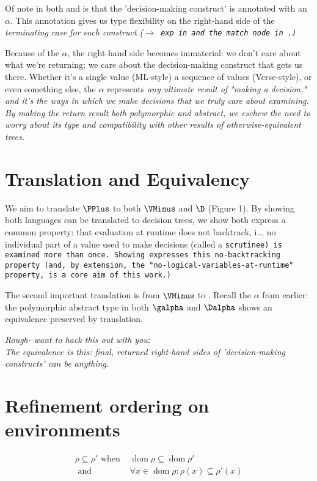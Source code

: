 \documentclass[]{article}
\DeclareMathOperator{\dom}{dom}
\begin{document}
Of note in both {\VMinus} and {\D} is that the 'decision-making construct' is 
annotated with an $\alpha$. This annotation gives us type flexibility on the 
right-hand side of the \it{terminating} case for each construct 
(\tt{$\rightarrow$ exp} in {\VMinus} and the match node in {\D}.) 

Because of the $\alpha$, the right-hand side becomes immaterial: we don't care
about what we're returning; we care about the decision-making construct that
gets us there. Whether it's a single value (ML-style) a sequence of values
(Verse-style), or even something else, the $\alpha$ represents \it{any} ultimate
result of "making a decision," and it's the ways in which we make decisions that
we truly care about examining. By making the return result both polymorphic and
abstract, we eschew the need to worry about its type and compatibility with
other results of otherwise-equivalent trees. 

\section{Translation and Equivalency}

We aim to translate ${\PPlus}$ to both ${\VMinus}$ and ${\D}$ (Figure 1). By showing both
languages can be translated to decision trees, we show both express a common
property: that evaluation at runtime does not backtrack, i.\expr., no individual
part of a value used to make decisions (called a \tt{scrutinee}) is examined
more than once. Showing {\VMinus} expresses this no-backtracking property (and, by
extension, the "no-logical-variables-at-runtime" property, is a core aim of this
work.)

The second important translation is from ${\VMinus}$ to {\D}. Recall the $\alpha$ from
earlier: the polymorphic abstract type in both $\galpha$ and $\Dalpha$ shows
an equivalence preserved by translation. 

\it{Rough- want to hack this out with you:} \\
The equivalence is this: final, returned right-hand sides of 'decision-making 
constructs' can be anything. 


        
\section{Refinement ordering on environments}

\begin{align*}
\rho \subseteq \rho' \text{ when }&\dom\rho  \subseteq \dom \rho'\\
\text{ and } &\forall x \in \dom \rho: \rho(x) \subseteq \rho'(x)
\end{align*}
\end{document}
